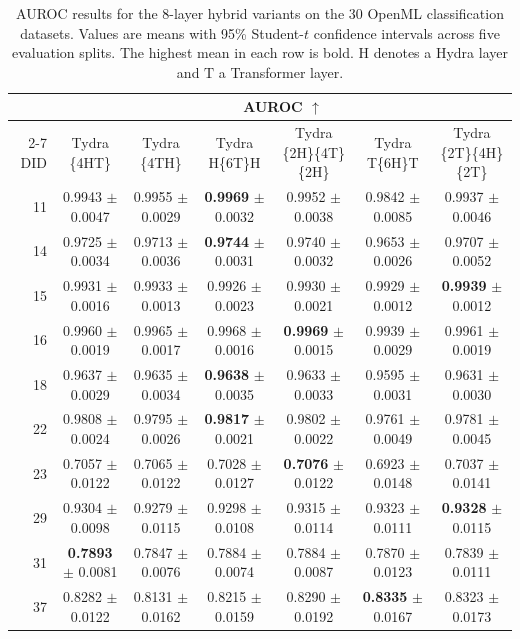 \begin{table}[t]
\centering
\caption{AUROC results for the 8-layer hybrid variants on the 30 OpenML classification datasets. Values are means with 95\% Student-$t$ confidence intervals across five evaluation splits. The highest mean in each row is bold. $\mathrm{H}$ denotes a Hydra layer and $\mathrm{T}$ a Transformer layer.}
\label{tab:hybrid_variants_auc}
\setlength{\tabcolsep}{4pt}
\renewcommand{\arraystretch}{1.04}
\scriptsize
\begin{tabular*}{\textwidth}{@{\extracolsep{\fill}}rcccccc@{}}
\toprule
& \multicolumn{6}{c}{AUROC $\uparrow$} \\
\cmidrule(lr){2-7}
DID & Tydra \{4HT\} & Tydra \{4TH\} & Tydra H\{6T\}H & Tydra \{2H\}\{4T\}\{2H\} & Tydra T\{6H\}T & Tydra \{2T\}\{4H\}\{2T\} \\
\midrule
11 & 0.9943 $\pm$ 0.0047 & 0.9955 $\pm$ 0.0029 & \textbf{0.9969} $\pm$ 0.0032 & 0.9952 $\pm$ 0.0038 & 0.9842 $\pm$ 0.0085 & 0.9937 $\pm$ 0.0046 \\
14 & 0.9725 $\pm$ 0.0034 & 0.9713 $\pm$ 0.0036 & \textbf{0.9744} $\pm$ 0.0031 & 0.9740 $\pm$ 0.0032 & 0.9653 $\pm$ 0.0026 & 0.9707 $\pm$ 0.0052 \\
15 & 0.9931 $\pm$ 0.0016 & 0.9933 $\pm$ 0.0013 & 0.9926 $\pm$ 0.0023 & 0.9930 $\pm$ 0.0021 & 0.9929 $\pm$ 0.0012 & \textbf{0.9939} $\pm$ 0.0012 \\
16 & 0.9960 $\pm$ 0.0019 & 0.9965 $\pm$ 0.0017 & 0.9968 $\pm$ 0.0016 & \textbf{0.9969} $\pm$ 0.0015 & 0.9939 $\pm$ 0.0029 & 0.9961 $\pm$ 0.0019 \\
18 & 0.9637 $\pm$ 0.0029 & 0.9635 $\pm$ 0.0034 & \textbf{0.9638} $\pm$ 0.0035 & 0.9633 $\pm$ 0.0033 & 0.9595 $\pm$ 0.0031 & 0.9631 $\pm$ 0.0030 \\
22 & 0.9808 $\pm$ 0.0024 & 0.9795 $\pm$ 0.0026 & \textbf{0.9817} $\pm$ 0.0021 & 0.9802 $\pm$ 0.0022 & 0.9761 $\pm$ 0.0049 & 0.9781 $\pm$ 0.0045 \\
23 & 0.7057 $\pm$ 0.0122 & 0.7065 $\pm$ 0.0122 & 0.7028 $\pm$ 0.0127 & \textbf{0.7076} $\pm$ 0.0122 & 0.6923 $\pm$ 0.0148 & 0.7037 $\pm$ 0.0141 \\
29 & 0.9304 $\pm$ 0.0098 & 0.9279 $\pm$ 0.0115 & 0.9298 $\pm$ 0.0108 & 0.9315 $\pm$ 0.0114 & 0.9323 $\pm$ 0.0111 & \textbf{0.9328} $\pm$ 0.0115 \\
31 & \textbf{0.7893} $\pm$ 0.0081 & 0.7847 $\pm$ 0.0076 & 0.7884 $\pm$ 0.0074 & 0.7884 $\pm$ 0.0087 & 0.7870 $\pm$ 0.0123 & 0.7839 $\pm$ 0.0111 \\
37 & 0.8282 $\pm$ 0.0122 & 0.8131 $\pm$ 0.0162 & 0.8215 $\pm$ 0.0159 & 0.8290 $\pm$ 0.0192 & \textbf{0.8335} $\pm$ 0.0167 & 0.8323 $\pm$ 0.0173 \\

\end{tabular*}
\end{table}
